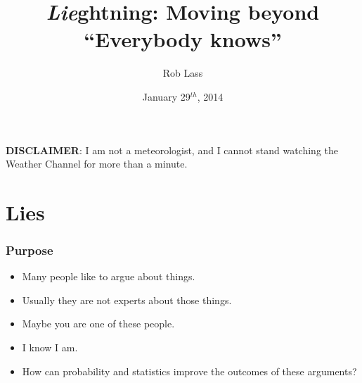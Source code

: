 \documentclass{beamer}
\title[\textit{Lie}ghtning]{\textit{Lie}ghtning: Moving beyond ``Everybody knows''} %
\author{Rob Lass} %
\institute[AWeber] %
{
AWeber Communications\\
1100 Manor Drive \\ 
Chalfont, PA 18914 \\
\medskip
\textit{robl@aweber.com} %
}
\date{January 29$^{th}$, 2014} %
\begin{document}
\begin{frame}
\titlepage %
\textbf{DISCLAIMER}:  I am not a meteorologist, and I cannot stand watching the Weather
Channel for more than a minute.
\end{frame}


\section{Lies}



\begin{frame}
\frametitle{Purpose}
\begin{itemize}
    \item Many people like to argue about things.
    \item Usually they are not experts about those things.
    \item Maybe you are one of these people.
    \item I know I am.
    \item How can probability and statistics improve the outcomes of these
        arguments?
\end{itemize}
\end{frame}
\end{document}
